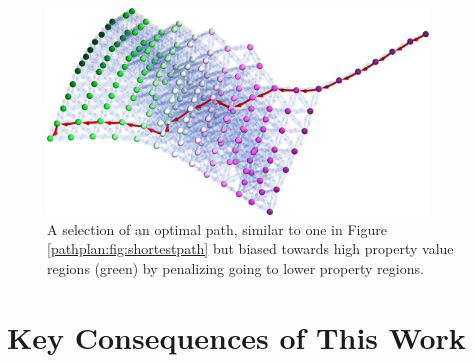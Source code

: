 \begin{figure}[H]
    \centering
    \includegraphics[width=0.9\textwidth]{pathplanning/InfeasibilityGliding_HighRMSAD.png}
    \caption{A selection of an optimal path, similar to one in Figure \ref{pathplan:fig:shortestpath} but biased towards high property value regions (green) by penalizing going to lower property regions.}
    \label{pathplan:fig:highrmsad}
\end{figure}

\section{Key Consequences of This Work} \label{pathplan:sec:keyconsequences}

\todo



\printbibliography[heading=subbibintoc]